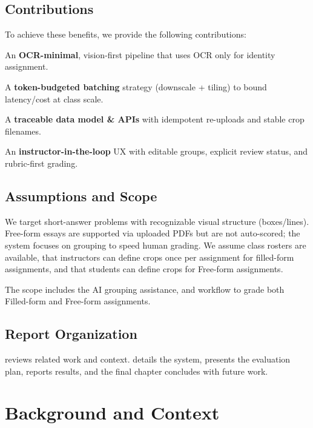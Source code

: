 \documentclass[ms,twoside,print]{nuthesis}
\begin{document}
\section{Contributions}

To achieve these benefits, we provide the following contributions:

\begin{compactitem}
  \item An \textbf{OCR-minimal}, vision-first pipeline that uses OCR only for identity assignment.
  \item A \textbf{token-budgeted batching} strategy (downscale + tiling) to bound latency/cost at class scale.
  \item A \textbf{traceable data model \& APIs} with idempotent re-uploads and stable crop filenames.
  \item An \textbf{instructor-in-the-loop} UX with editable groups, explicit review status, and rubric-first grading.
\end{compactitem}

\section{Assumptions and Scope}

We target short-answer problems with recognizable visual structure (boxes/lines). Free-form essays are supported via uploaded PDFs but are not auto-scored; the system focuses on grouping to speed human grading. We assume class rosters are available, that instructors can define crops once per assignment for filled-form assignments, and that students can define crops for Free-form assignments.

The scope includes the AI grouping assistance, and workflow to grade both Filled-form and Free-form assignments. 

\section{Report Organization}

 reviews related work and context.  details the system,  presents the evaluation plan,  reports results, and the final chapter concludes with future work.

\chapter{Background and Context}\label{chap:bg}
\end{document}

